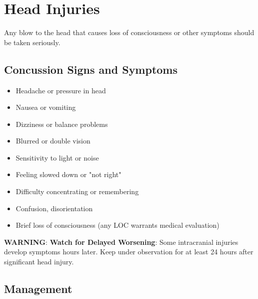 
\section{Head Injuries}

Any blow to the head that causes loss of consciousness or other symptoms should be taken seriously.


\subsection{Concussion Signs and Symptoms}

\begin{itemize}[leftmargin=*]
  \item Headache or pressure in head
  \item Nausea or vomiting
  \item Dizziness or balance problems
  \item Blurred or double vision
  \item Sensitivity to light or noise
  \item Feeling slowed down or "not right"
  \item Difficulty concentrating or remembering
  \item Confusion, disorientation
  \item Brief loss of consciousness (any LOC warrants medical evaluation)
\end{itemize}

\textbf{WARNING}: \textbf{Watch for Delayed Worsening}: Some intracranial injuries develop symptoms hours later. Keep under observation for at least 24 hours after significant head injury.

\subsection{Management}

